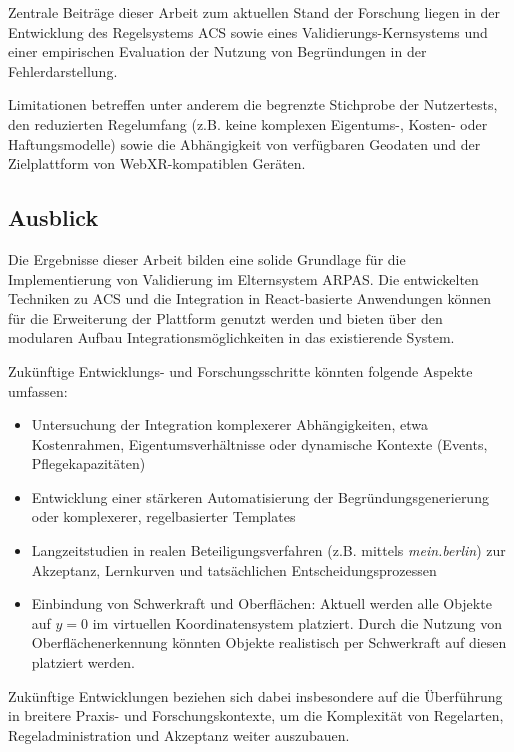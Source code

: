 
Zentrale Beiträge dieser Arbeit zum aktuellen Stand der Forschung liegen in der Entwicklung des Regelsystems ACS sowie eines Validierungs-Kernsystems und einer empirischen Evaluation der Nutzung von Begründungen in der Fehlerdarstellung.

\medskip

Limitationen betreffen unter anderem die begrenzte Stichprobe der Nutzertests, den reduzierten Regelumfang (z.B. keine komplexen Eigentums-, Kosten- oder Haftungsmodelle) sowie die Abhängigkeit von verfügbaren Geodaten und der Zielplattform von WebXR-kompatiblen Geräten.

\subsection{Ausblick}

Die Ergebnisse dieser Arbeit bilden eine solide Grundlage für die Implementierung von Validierung im Elternsystem ARPAS. Die entwickelten Techniken zu ACS und die Integration in React-basierte Anwendungen können für die Erweiterung der Plattform genutzt werden und bieten über den modularen Aufbau Integrationsmöglichkeiten in das existierende System.

Zukünftige Entwicklungs- und Forschungsschritte könnten folgende Aspekte umfassen:

\begin{itemize}
    \item Untersuchung der Integration komplexerer Abhängigkeiten, etwa Kostenrahmen, Eigentumsverhältnisse oder dynamische Kontexte (Events, Pflegekapazitäten) 
    \item Entwicklung einer stärkeren Automatisierung der Begründungsgenerierung oder komplexerer, regelbasierter Templates
    \item Langzeitstudien in realen Beteiligungsverfahren (z.B. mittels \textit{mein.berlin}) zur Akzeptanz, Lernkurven und tatsächlichen Entscheidungsprozessen
    \item Einbindung von Schwerkraft und Oberflächen: Aktuell werden alle Objekte auf $y=0$ im virtuellen Koordinatensystem platziert. Durch die Nutzung von Oberflächenerkennung könnten Objekte realistisch per Schwerkraft auf diesen platziert werden.
\end{itemize}

Zukünftige Entwicklungen beziehen sich dabei insbesondere auf die Überführung in breitere Praxis- und Forschungskontexte, um die Komplexität von Regelarten, Regeladministration und Akzeptanz weiter auszubauen.